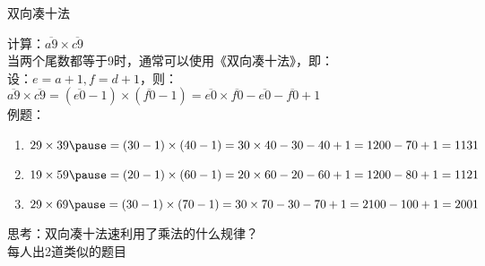 \documentclass[aspectratio=169]{ctexbeamer} %
\begin{document}
\begin{frame}[t]{双向凑十法}
\begin{spacing}{1.2}
\normalsize
计算：$\overline{a9} \times \overline{c9}$ \\
当两个尾数都等于9时，通常可以使用《双向凑十法》，即：\\
设：$e = a+1, f = d+1$，则：\\
$\overline{a9} \times \overline{c9} = (\overline{e0}-1) \times (\overline{f0} - 1)  = \overline{e0} \times \overline{f0} - \overline{e0} - \overline{f0} + 1$ \\
例题：
\begin{enumerate}[label={\arabic*.}]
\item $29 \times 39 \pause = (30-1) \times (40-1) = 30 \times 40 - 30 - 40 + 1=1200-70+1=1131$
\item $19 \times 59 \pause = (20 -1) \times (60-1) = 20 \times 60 - 20 - 60 + 1=1200-80+1=1121$
\item $29 \times 69 \pause = (30 -1) \times (70-1) = 30 \times 70 - 30 - 70 + 1=2100-100+1=2001$
\end{enumerate}
\alert{思考：双向凑十法速利用了乘法的什么规律？}\\
\alert{每人出2道类似的题目} 
\end{spacing}
\end{frame}
\end{document}
